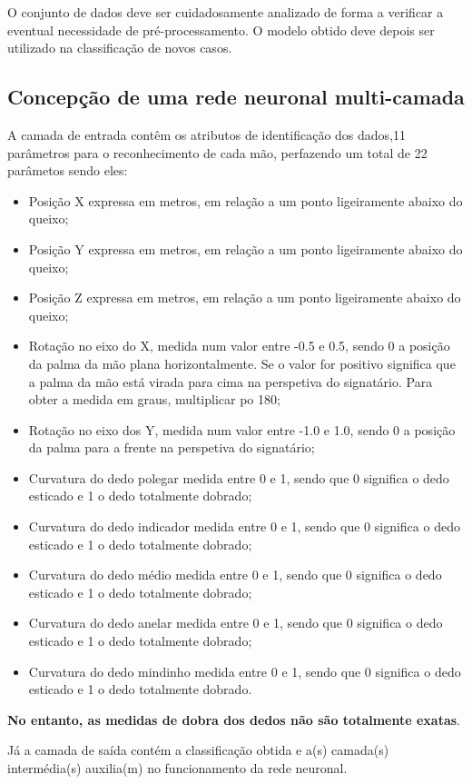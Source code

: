 \documentclass[10pt,a4paper]{article}
\begin{document}
O conjunto de dados deve ser cuidadosamente analizado de forma a verificar a eventual necessidade de pré-processamento. O modelo obtido deve depois ser utilizado na classificação de novos casos. 

\subsection{Concepção de uma rede neuronal multi-camada}
\subitem

A camada de entrada contêm os atributos de identificação dos dados,11 parâmetros para o reconhecimento de cada mão, perfazendo um total de 22 parâmetos sendo eles:
\begin{itemize}
\item Posição X expressa em metros, em relação a um ponto ligeiramente abaixo do queixo;
\item Posição Y expressa em metros, em relação a um ponto ligeiramente abaixo do queixo;
\item Posição Z expressa em metros, em relação a um ponto ligeiramente abaixo do queixo;
\item Rotação no eixo do X, medida num valor entre -0.5 e 0.5, sendo 0 a posição da palma da mão plana horizontalmente. Se o valor for positivo significa que a palma da mão está virada para cima na perspetiva do signatário. Para obter a medida em graus, multiplicar po 180;
\item Rotação no eixo dos Y, medida num valor entre -1.0 e 1.0, sendo 0 a posição da palma para a frente na perspetiva do signatário;
\item Curvatura do dedo polegar medida entre 0 e 1, sendo que 0 significa o dedo esticado e 1 o dedo totalmente dobrado;
\item Curvatura do dedo indicador medida entre 0 e 1, sendo que 0 significa o dedo esticado e 1 o dedo totalmente dobrado;
\item Curvatura do dedo médio medida entre 0 e 1, sendo que 0 significa o dedo esticado e 1 o dedo totalmente dobrado;
\item Curvatura do dedo anelar medida entre 0 e 1, sendo que 0 significa o dedo esticado e 1 o dedo totalmente dobrado;
\item Curvatura do dedo mindinho medida entre 0 e 1, sendo que 0 significa o dedo esticado e 1 o dedo totalmente dobrado.
\end{itemize}
\textbf{No entanto, as medidas de dobra dos dedos não são totalmente exatas}.

Já a camada de saída contém a classificação obtida e a(s) camada(s) intermédia(s) auxilia(m) no funcionamento da rede neuronal.
\end{document}
